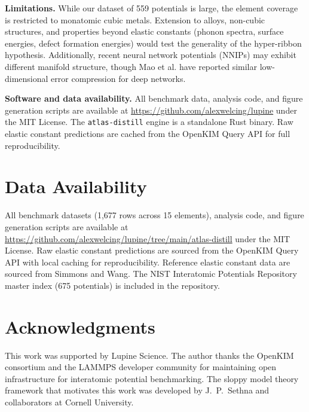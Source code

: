 \documentclass[twocolumn,9pt]{extarticle}
\begin{document}
\textbf{Limitations.} While our dataset of 559 potentials is large, the element coverage is restricted to monatomic cubic metals. Extension to alloys, non-cubic structures, and properties beyond elastic constants (phonon spectra, surface energies, defect formation energies) would test the generality of the hyper-ribbon hypothesis. Additionally, recent neural network potentials (NNIPs) may exhibit different manifold structure, though Mao et al.\cite{mao2024,mao2026} have reported similar low-dimensional error compression for deep networks.

\textbf{Software and data availability.} All benchmark data, analysis code, and figure generation scripts are available at \url{https://github.com/alexwelcing/lupine} under the MIT License. The \texttt{atlas-distill} engine is a standalone Rust binary. Raw elastic constant predictions are cached from the OpenKIM Query API for full reproducibility.

\section*{Data Availability}

All benchmark datasets (1,677 rows across 15 elements), analysis code, and figure generation scripts are available at \url{https://github.com/alexwelcing/lupine/tree/main/atlas-distill} under the MIT License. Raw elastic constant predictions are sourced from the OpenKIM Query API\cite{openkim} with local caching for reproducibility. Reference elastic constant data are sourced from Simmons and Wang\cite{simmons1971}. The NIST Interatomic Potentials Repository master index (675 potentials) is included in the repository.

\section*{Acknowledgments}

This work was supported by Lupine Science. The author thanks the OpenKIM consortium and the LAMMPS developer community for maintaining open infrastructure for interatomic potential benchmarking. The sloppy model theory framework that motivates this work was developed by J.~P.~Sethna and collaborators at Cornell University.



\end{document}
